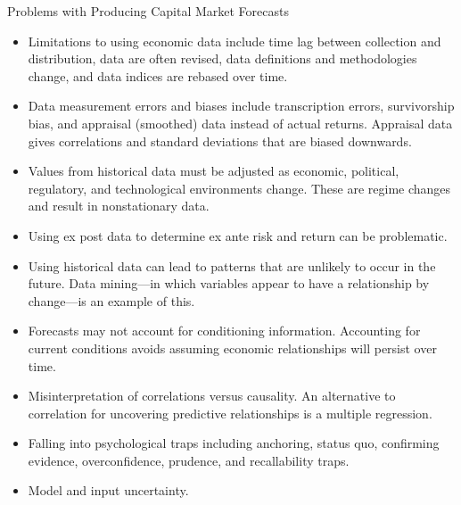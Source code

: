 \documentclass[../custom]{flashcards}
\newcommand{\studyArea}{Capital Market Expectations}
\begin{document}
\begin{flashcard}[\studyArea]{Problems with Producing Capital Market Forecasts}
    \begin{itemize}[itemsep=.2\itemsep]
        \item Limitations to using economic data include time lag between collection and distribution, data are often revised, data definitions and methodologies change, and data indices are rebased over time.
        \item Data measurement errors and biases include transcription errors, survivorship bias, and appraisal (smoothed) data instead of actual returns. Appraisal data gives correlations and standard deviations that are biased downwards.
        \item Values from historical data must be adjusted as economic, political, regulatory, and technological environments change. These are regime changes and result in nonstationary data.
        \item Using ex post data to determine ex ante risk and return can be problematic.
        \item Using historical data can lead to patterns that are unlikely to occur in the future. Data mining---in which variables appear to have a relationship by change---is an example of this.
        \item Forecasts may not account for conditioning information. Accounting for current conditions avoids assuming economic relationships will persist over time.
        \item Misinterpretation of correlations versus causality. An alternative to correlation for uncovering predictive relationships is a multiple regression.
        \item Falling into psychological traps including anchoring, status quo, confirming evidence, overconfidence, prudence, and recallability traps.
        \item Model and input uncertainty.
    \end{itemize}
\end{flashcard}
\end{document}
